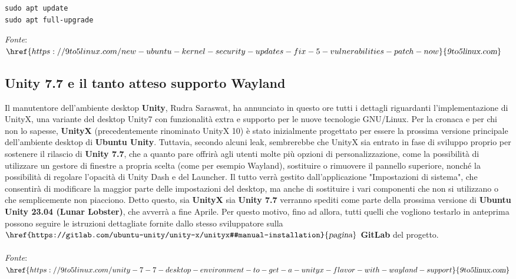 \documentclass[a4paper,twoside]{article}
\begin{document}
\begin{verbatim}
sudo apt update
sudo apt full-upgrade
\end{verbatim}

\noindent \textit{Fonte}:\\
$\href{https://9to5linux.com/new-ubuntu-kernel-security-updates-fix-5-vulnerabilities-patch-now}{\textsl{9to5linux.com}}$


\subsection{Unity 7.7 e il tanto atteso supporto Wayland}
Il manutentore dell'ambiente desktop \textbf{Unity}, Rudra Saraswat, ha annunciato in questo ore tutti i dettagli riguardanti l'implementazione di UnityX, una variante del desktop Unity7 con funzionalità extra e supporto per le nuove tecnologie GNU/Linux. Per la cronaca e per chi non lo sapesse, \textbf{UnityX} (precedentemente rinominato UnityX 10) è stato inizialmente progettato per essere la prossima versione principale dell'ambiente desktop di \textbf{Ubuntu Unity}. Tuttavia, secondo alcuni leak, sembrerebbe che UnityX sia entrato in fase di sviluppo proprio per sostenere il rilascio di \textbf{Unity 7.7}, che a quanto pare offrirà agli utenti molte più opzioni di personalizzazione, come la possibilità di utilizzare un gestore di finestre a propria scelta (come per esempio Wayland), sostituire o rimuovere il pannello superiore, nonché la possibilità di regolare l'opacità di Unity Dash e del Launcher. Il tutto verrà gestito dall'applicazione "Impostazioni di sistema", che consentirà di modificare la maggior parte delle impostazioni del desktop, ma anche di sostituire i vari componenti che non si utilizzano o che semplicemente non piacciono. Detto questo, sia \textbf{UnityX} sia \textbf{Unity 7.7} verranno spediti come parte della prossima versione di \textbf{Ubuntu Unity 23.04 (Lunar Lobster)},  che avverrà a fine Aprile. Per questo motivo, fino ad allora, tutti quelli che vogliono testarlo in anteprima possono seguire le istruzioni dettagliate fornite dallo stesso sviluppatore sulla $\href{https://gitlab.com/ubuntu-unity/unity-x/unityx#manual-installation}{\textsl{pagina}}$ \textbf{GitLab} del progetto.\\
\\
\textit{Fonte}:\\
$\href{https://9to5linux.com/unity-7-7-desktop-environment-to-get-a-unityx-flavor-with-wayland-support}{\textsl{9to5linux.com}}$
\end{document}
